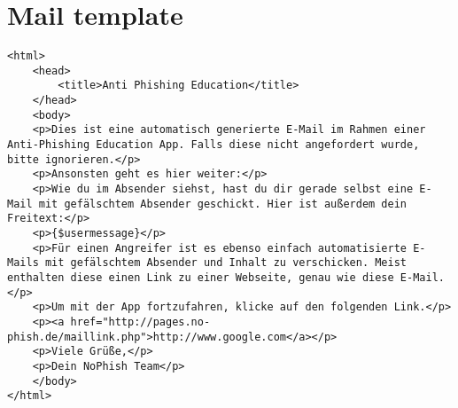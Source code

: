 \section{Mail template}
\label{a:mail}
\lstset{language=HTML}
\begin{lstlisting}
<html>
	<head>
		<title>Anti Phishing Education</title>
	</head>
	<body>
	<p>Dies ist eine automatisch generierte E-Mail im Rahmen einer Anti-Phishing Education App. Falls diese nicht angefordert wurde, bitte ignorieren.</p>
	<p>Ansonsten geht es hier weiter:</p>
	<p>Wie du im Absender siehst, hast du dir gerade selbst eine E-Mail mit gefälschtem Absender geschickt. Hier ist außerdem dein Freitext:</p>
	<p>{$usermessage}</p>
	<p>Für einen Angreifer ist es ebenso einfach automatisierte E-Mails mit gefälschtem Absender und Inhalt zu verschicken. Meist enthalten diese einen Link zu einer Webseite, genau wie diese E-Mail.</p>
	<p>Um mit der App fortzufahren, klicke auf den folgenden Link.</p>
	<p><a href="http://pages.no-phish.de/maillink.php">http://www.google.com</a></p>
	<p>Viele Grüße,</p>
	<p>Dein NoPhish Team</p>
	</body>
</html>
\end{lstlisting}